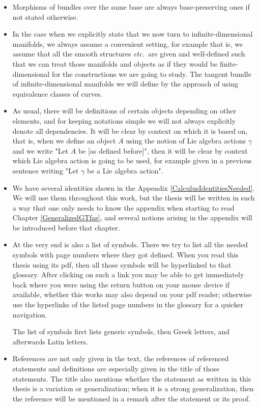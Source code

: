 \begin{itemize}
	\item Morphisms of bundles over the same base are always base-preserving ones if not stated otherwise.
	\item In the case when we explicitly state that we now turn to infinite-dimensional manifolds, we always assume a convenient setting, for example that is, we assume that all the smooth structures \textit{etc.}~are given and well-defined such that we can treat those manifolds and objects as if they would be finite-dimensional for the constructions we are going to study. The tangent bundle of infinite-dimensional manifolds we will define by the approach of using equivalence classes of curves.
	\item As usual, there will be definitions of certain objects depending on other elements, and for keeping notations simple we will not always explicitly denote all dependencies. It will be clear by context on which it is based on, that is, when we define an object $A$ using the notion of Lie algebra actions $\gamma$ and we write "Let $A$ be [as defined before]", then it will be clear by context which Lie algebra action is going to be used, for example given in a previous sentence writing "Let $\gamma$ be a Lie algebra action".
	\item We have several identities shown in the Appendix \ref{CalculusIdentitiesNeeded}. We will use them throughout this work, but the thesis will be written in such a way that one only needs to know the appendix when starting to read Chapter \ref{GeneralizedGTfas}, and several notions arising in the appendix will be introduced before that chapter.
	\item At the very end is also a list of symbols. There we try to list all the needed symbols with page numbers where they got defined. When you read this thesis using its pdf, then all those symbols will be hyperlinked to that glossary. After clicking on such a link you may be able to get immediately back where you were using the return button on your mouse device if available, whether this works may also depend on your pdf reader; otherwise use the hyperlinks of the listed page numbers in the glossary for a quicker navigation.
	
	The list of symbols first lists generic symbols, then Greek letters, and afterwards Latin letters.
	\item References are not only given in the text, the references of referenced statements and definitions are especially given in the title of those statements. The title also mentions whether the statement as written in this thesis is a variation or generalization; when it is a strong generalization, then the reference will be mentioned in a remark after the statement or its proof.
\end{itemize}
